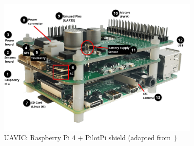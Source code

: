 \begin{figure}[!hbt]
  \centering
  \includegraphics[width=0.9\textwidth]{./img/png/pilotpi-annotated} 
  \caption[UAVIC: Raspberry Pi 4 + PilotPi shield]{UAVIC: Raspberry Pi 4 +
    PilotPi shield (adapted from~\cite{px4-pilotpi})\footnotemark}%
  \label{fig:pilotpi-annot}
\end{figure}
%
%







